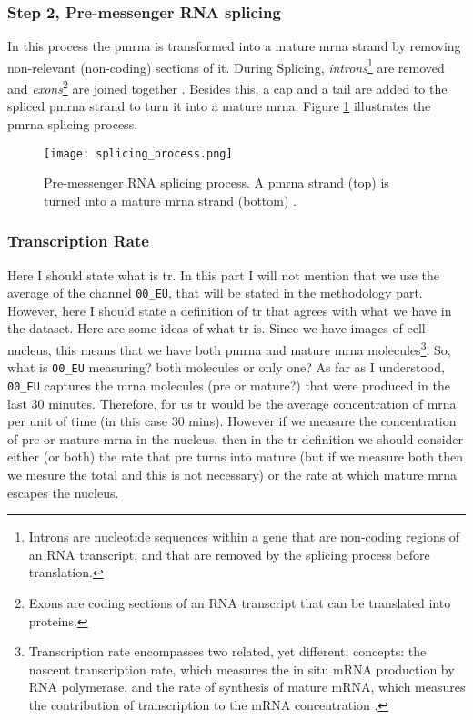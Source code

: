 \subsubsection{Step 2, Pre-messenger RNA splicing}
In this process the \gls{pmrna} is transformed into a mature \gls{mrna} strand by removing non-relevant (non-coding) sections of it.
During Splicing, \textit{introns}\footnote{Introns are nucleotide sequences within a gene that are non-coding regions of an RNA transcript, and that are removed by the splicing process before translation.} are removed and \textit{exons}\footnote{Exons are coding sections of an RNA transcript that can be translated into proteins.} are joined together \cite{Biochemistry}. Besides this, a cap and a tail are added to the spliced \gls{pmrna} strand to turn it into a mature \gls{mrna}. Figure \ref{fig:BB:splicing} illustrates the \gls{pmrna} splicing process.

\begin{figure}[htb]
  \centering
  \texttt{[image: splicing\_process.png]}
  \caption{Pre-messenger RNA splicing process. A \gls{pmrna} strand (top) is turned into a mature \gls{mrna} strand (bottom) \cite{wiki:Primary_transcript}.}
  \label{fig:BB:splicing}
\end{figure}

\subsubsection{Transcription Rate}

Here I should state what is \gls{tr}. In this part I will not mention that we use the average of the channel \texttt{00\_EU}, that will be stated in the methodology part. However, here I should state a definition of \gls{tr} that agrees with what we have in the dataset. Here are some ideas of what \gls{tr} is.
Since we have images of cell nucleus, this means that we have both \gls{pmrna} and mature \gls{mrna} molecules\footnote{Transcription rate encompasses two related, yet different, concepts: the nascent transcription rate, which measures the in situ mRNA production by RNA polymerase, and the rate of synthesis of mature mRNA, which measures the contribution of transcription to the mRNA concentration \cite{what_is_tr}.}. So, what is \texttt{00\_EU} measuring? both molecules or only one?
As far as I understood, \texttt{00\_EU} captures the \gls{mrna} molecules (pre or mature?) that were produced in the last 30 minutes. Therefore, for us \gls{tr} would be the average concentration of \gls{mrna} per unit of time (in this case 30 mins). However if we measure the concentration of pre or mature \gls{mrna} in the nucleus, then in the \gls{tr} definition we should consider either (or both) the rate that pre turns into mature (but if we measure both then we mesure the total and this is not necessary) or the rate at which mature \gls{mrna} escapes the nucleus.

